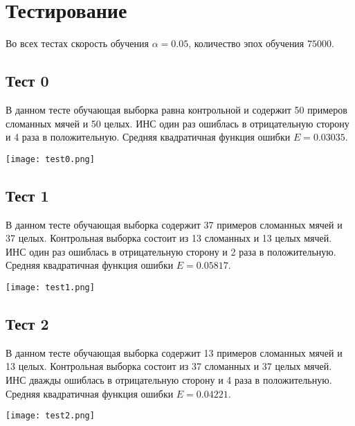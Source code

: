 \section{Тестирование}
	\parindent=0cm
	Во всех тестах скорость обучения $\alpha = 0.05$, количество эпох обучения $75000$.
\subsection{Тест 0}
	В данном тесте обучающая выборка равна контрольной и содержит 50 примеров сломанных мячей и 50 целых.
	ИНС один раз ошиблась в отрицательную сторону и 4 раза в положительную.
	Средняя квадратичная функция ошибки $E = 0.03035$.

	\texttt{[image: test0.png]}

\newpage
\subsection{Тест 1}

	В данном тесте обучающая выборка содержит 37 примеров сломанных мячей и 37 целых.
	Контрольная выборка состоит из 13 сломанных и 13 целых мячей.
	ИНС один раз ошиблась в отрицательную сторону и 2 раза в положительную.
	Средняя квадратичная функция ошибки $E = 0.05817$.

	\texttt{[image: test1.png]}

\newpage
\subsection{Тест 2}
	В данном тесте обучающая выборка содержит 13 примеров сломанных мячей и 13 целых.
	Контрольная выборка состоит из 37 сломанных и 37 целых мячей.
	ИНС дважды ошиблась в отрицательную сторону и 4 раза в положительную.
	Средняя квадратичная функция ошибки $E = 0.04221$.

	\texttt{[image: test2.png]}
	\parindent=0.2cm
